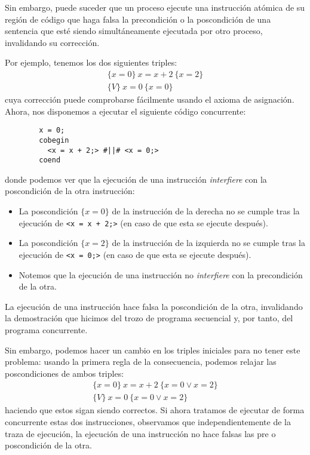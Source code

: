 Sin embargo, puede suceder que un proceso ejecute una instrucción atómica de su región de código que haga falsa la precondición o la poscondición de una sentencia que esté siendo simultáneamente ejecutada por otro proceso, invalidando su corrección.

\begin{ejemplo}
    Por ejemplo, tenemos los dos siguientes triples:
    \begin{gather*}
        \{x=0\}\ x=x+2\ \{x=2\} \\
        \{V\}\ x=0\ \{x=0\}
    \end{gather*}
    cuya corrección puede comprobarse fácilmente usando el axioma de asignación.\\

    Ahora, nos disponemos a ejecutar el siguiente código concurrente:
    \begin{verbatim}
        x = 0;
        cobegin
          <x = x + 2;> #||# <x = 0;>
        coend
    \end{verbatim}
    donde podemos ver que la ejecución de una instrucción \textit{interfiere} con la poscondición de la otra instrucción:
    \begin{itemize}
        \item La poscondición $\{x=0\}$ de la instrucción de la derecha no se cumple tras la ejecución de \verb|<x = x + 2;>| (en caso de que esta se ejecute después).
        \item La poscondición $\{x=2\}$ de la instrucción de la izquierda no se cumple tras la ejecución de \verb|<x = 0;>| (en caso de que esta se ejecute después).
        \item Notemos que la ejecución de una instrucción no \textit{interfiere} con la precondición de la otra.
    \end{itemize}
    La ejecución de una instrucción hace falsa la poscondición de la otra, invalidando la demostración que hicimos del trozo de programa secuencial y, por tanto, del programa concurrente.

    Sin embargo, podemos hacer un cambio en los triples iniciales para no tener este problema: usando la primera regla de la consecuencia, podemos relajar las poscondiciones de ambos triples:
    \begin{gather*}
        \{x=0\}\ x=x+2\ \{x=0 \lor x=2\} \\
        \{V\}\ x=0\ \{x=0 \lor x=2\}
    \end{gather*}
    haciendo que estos sigan siendo correctos. Si ahora tratamos de ejecutar de forma concurrente estas dos instrucciones, observamos que independientemente de la traza de ejecución, la ejecución de una instrucción no hace falsas las pre o poscondición de la otra.
\end{ejemplo}
